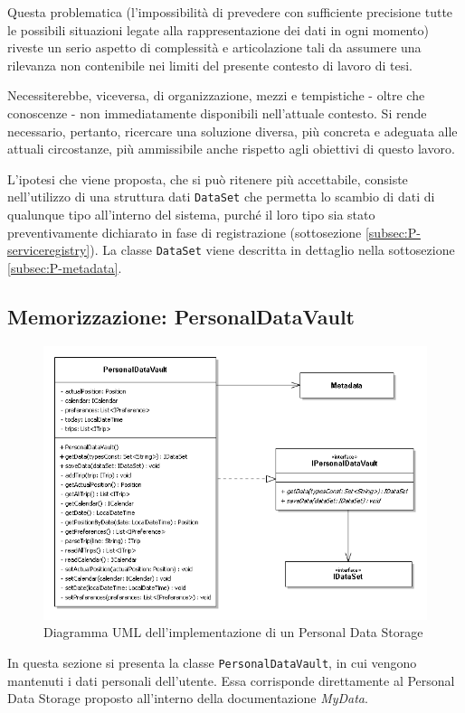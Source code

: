 Questa problematica (l’impossibilit\`a di prevedere con sufficiente precisione tutte le possibili situazioni legate alla rappresentazione dei dati in ogni momento) riveste un serio aspetto di complessit\`a e articolazione tali da assumere una rilevanza non contenibile nei limiti del presente contesto di lavoro di tesi.

Necessiterebbe, viceversa, di organizzazione, mezzi e tempistiche - oltre che conoscenze - non immediatamente disponibili nell'attuale contesto. Si rende necessario, pertanto, ricercare una soluzione diversa, pi\`u concreta e adeguata alle attuali circostanze, pi\`u ammissibile anche rispetto agli obiettivi di questo lavoro.

L'ipotesi che viene proposta, che si pu\`o ritenere pi\`u accettabile, consiste nell’utilizzo di una struttura dati \texttt{DataSet} che permetta lo scambio di dati di qualunque tipo all’interno del sistema, purch\'e il loro tipo sia stato preventivamente dichiarato in fase di registrazione (sottosezione \ref{subsec:P-serviceregistry}). La classe \texttt{DataSet} viene descritta in dettaglio nella sottosezione \ref{subsec:P-metadata}.

\subsection{Memorizzazione: PersonalDataVault}
\begin{figure} [h]
	\centering
	\includegraphics[width=0.8\linewidth]{pictures/PersonalDataVault.png}
	\caption{Diagramma UML dell'implementazione di un Personal Data Storage}
	\label{fig:PersonalDataVault}
\end{figure}
In questa sezione si presenta la classe \texttt{PersonalDataVault}, in cui vengono mantenuti i dati personali dell’utente. Essa corrisponde direttamente al Personal Data Storage proposto all’interno della documentazione \textit{MyData}.

